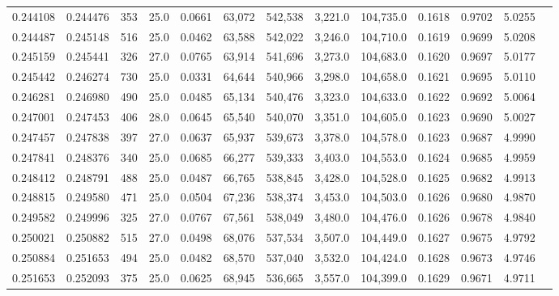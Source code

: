 \begin{tabular}{rrrrrrrrrrrrr}
0.244108 & 0.244476 &   353 & 25.0 &                                     0.0661 &  63,072 & 542,538 &   3,221.0 & 104,735.0 & 0.1618 & 0.9702 & 5.0255 \\
0.244487 & 0.245148 &   516 & 25.0 &                                     0.0462 &  63,588 & 542,022 &   3,246.0 & 104,710.0 & 0.1619 & 0.9699 & 5.0208 \\
0.245159 & 0.245441 &   326 & 27.0 &                                     0.0765 &  63,914 & 541,696 &   3,273.0 & 104,683.0 & 0.1620 & 0.9697 & 5.0177 \\
0.245442 & 0.246274 &   730 & 25.0 &                                     0.0331 &  64,644 & 540,966 &   3,298.0 & 104,658.0 & 0.1621 & 0.9695 & 5.0110 \\
0.246281 & 0.246980 &   490 & 25.0 &                                     0.0485 &  65,134 & 540,476 &   3,323.0 & 104,633.0 & 0.1622 & 0.9692 & 5.0064 \\
0.247001 & 0.247453 &   406 & 28.0 &                                     0.0645 &  65,540 & 540,070 &   3,351.0 & 104,605.0 & 0.1623 & 0.9690 & 5.0027 \\
0.247457 & 0.247838 &   397 & 27.0 &                                     0.0637 &  65,937 & 539,673 &   3,378.0 & 104,578.0 & 0.1623 & 0.9687 & 4.9990 \\
0.247841 & 0.248376 &   340 & 25.0 &                                     0.0685 &  66,277 & 539,333 &   3,403.0 & 104,553.0 & 0.1624 & 0.9685 & 4.9959 \\
0.248412 & 0.248791 &   488 & 25.0 &                                     0.0487 &  66,765 & 538,845 &   3,428.0 & 104,528.0 & 0.1625 & 0.9682 & 4.9913 \\
0.248815 & 0.249580 &   471 & 25.0 &                                     0.0504 &  67,236 & 538,374 &   3,453.0 & 104,503.0 & 0.1626 & 0.9680 & 4.9870 \\
0.249582 & 0.249996 &   325 & 27.0 &                                     0.0767 &  67,561 & 538,049 &   3,480.0 & 104,476.0 & 0.1626 & 0.9678 & 4.9840 \\
0.250021 & 0.250882 &   515 & 27.0 &                                     0.0498 &  68,076 & 537,534 &   3,507.0 & 104,449.0 & 0.1627 & 0.9675 & 4.9792 \\
0.250884 & 0.251653 &   494 & 25.0 &                                     0.0482 &  68,570 & 537,040 &   3,532.0 & 104,424.0 & 0.1628 & 0.9673 & 4.9746 \\
0.251653 & 0.252093 &   375 & 25.0 &                                     0.0625 &  68,945 & 536,665 &   3,557.0 & 104,399.0 & 0.1629 & 0.9671 & 4.9711 \\

\end{tabular}
